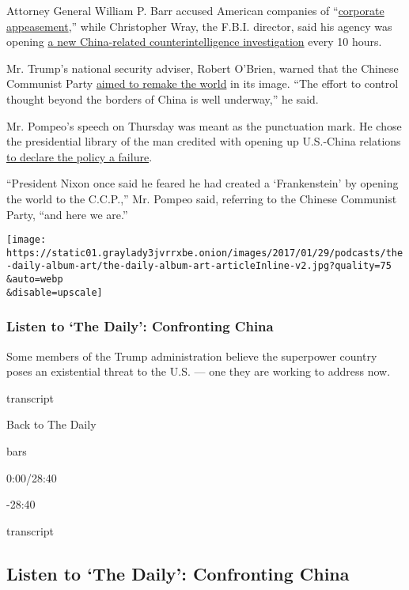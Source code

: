 Attorney General William P. Barr accused American companies of
``\href{https://www.justice.gov/opa/speech/attorney-general-william-p-barr-delivers-remarks-china-policy-gerald-r-ford-presidential}{corporate
appeasement},'' while Christopher Wray, the F.B.I. director, said his
agency was opening
\href{https://www.fbi.gov/news/speeches/the-threat-posed-by-the-chinese-government-and-the-chinese-communist-party-to-the-economic-and-national-security-of-the-united-states}{a
new China-related counterintelligence investigation} every 10 hours.

Mr. Trump's national security adviser, Robert O'Brien, warned that the
Chinese Communist Party
\href{https://www.whitehouse.gov/briefings-statements/chinese-communist-partys-ideology-global-ambitions/}{aimed
to remake the world} in its image. ``The effort to control thought
beyond the borders of China is well underway,'' he said.

Mr. Pompeo's speech on Thursday was meant as the punctuation mark. He
chose the presidential library of the man credited with opening up
U.S.-China relations
\href{https://www.state.gov/communist-china-and-the-free-worlds-future/}{to
declare the policy a failure}.

``President Nixon once said he feared he had created a `Frankenstein' by
opening the world to the C.C.P.,'' Mr. Pompeo said, referring to the
Chinese Communist Party, ``and here we are.''

\texttt{[image: https://static01.graylady3jvrrxbe.onion/images/2017/01/29/podcasts/the-daily-album-art/the-daily-album-art-articleInline-v2.jpg?quality=75\\\&auto=webp\\\&disable=upscale]}

\hypertarget{listen-to-the-daily-confronting-china}{%
\subsubsection{Listen to `The Daily': Confronting
China}\label{listen-to-the-daily-confronting-china}}

Some members of the Trump administration believe the superpower country
poses an existential threat to the U.S. --- one they are working to
address now.

transcript

Back to The Daily

bars

0:00/28:40

-28:40

transcript

\hypertarget{listen-to-the-daily-confronting-china-1}{%
\subsection{Listen to `The Daily': Confronting
China}\label{listen-to-the-daily-confronting-china-1}}

